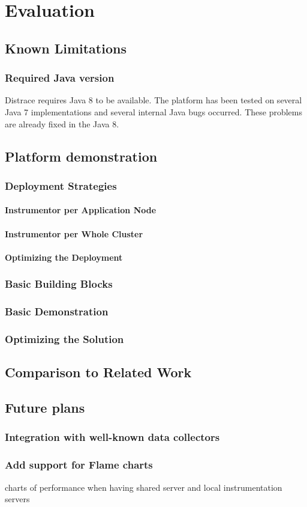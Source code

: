 \chapter{Evaluation}
\label{chap:evaluation}
\section{Known Limitations}
\subsection{Required Java version}
Distrace requires Java 8 to be available. The platform has been tested on several Java 7 implementations and several internal Java bugs occurred. These problems are already fixed in the Java 8.


\section{Platform demonstration}
\subsection{Deployment Strategies}
\subsubsection{Instrumentor per Application Node}
\subsubsection{Instrumentor per Whole Cluster}
\subsubsection{Optimizing the Deployment}
\subsection{Basic Building Blocks}
\subsection{Basic Demonstration}
\subsection{Optimizing the Solution}
\section{Comparison to Related Work}
\section{Future plans}
\subsection{Integration with well-known data collectors}
\subsection{Add support for Flame charts}
charts of performance when having shared server and local instrumentation servers